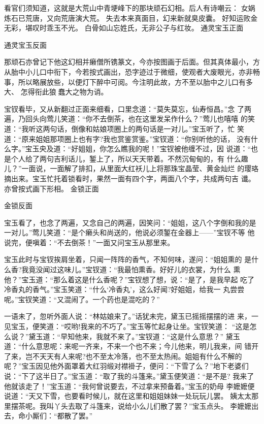 看官们须知道，这就是大荒山中青埂峰下的那块顽石幻相。后人有诗嘲云：
女娲炼石已荒唐，又向荒唐演大荒。
失去本来真面目，幻来新就臭皮囊。
好知运败金无彩，堪叹时乖玉不光。
白骨如山忘姓氏，无非公子与红妆。
通灵宝玉正面

通灵宝玉反面

那顽石亦曾记下他这幻相并癞僧所镌篆文，今亦按图画于后面。但其真体最小，方
从胎中小儿口中衔下，今若按式画出，恐字迹过于微细，使观者大废眼光，亦非畅
事，所以略展放些，以便灯下醉中可阅。今注明此故，方不至以胎中之儿口有多大、
怎得衔此狼蠢大之物为诮。

宝钗看毕，又从新翻过正面来细看，口里念道：“莫失莫忘，仙寿恒昌。”念
了两遍，乃回头向莺儿笑道：“你不去倒茶，也在这里发呆作什么？”莺儿也嘻嘻
的笑道：“我听这两句话，倒像和姑娘项圈上的两句话是一对儿。”宝玉听了，忙
笑道：“原来姐姐那项圈上也有字?我也赏鉴赏鉴。”宝钗道：“你别听他的话，
没有什么字。”宝玉央及道：“好姐姐，你怎么瞧我的呢！”宝钗被他缠不过，因
说道：“也是个人给了两句吉利话儿，錾上了，所以天天带着。不然沉甸甸的，有
什么趣儿？”一面说，一面解了排扣，从里面大红袄儿上将那珠宝晶莹、黄金灿烂
的璎珞摘出来。宝玉忙托着锁看时，果然一面有四个字，两面八个字，共成两句吉
谶。亦曾按式画下形相。
金锁正面

金锁反面

宝玉看了，也念了两遍，又念自己的两遍，因笑问：“姐姐，这八个字倒和我的是
一对儿。”莺儿笑道：“是个癞头和尚送的，他说必须錾在金器上——”宝钗不等
他说完，便嗔着：“不去倒茶！”一面又问宝玉从那里来。

宝玉此时与宝钗挨肩坐着，只闻一阵阵的香气，不知何味，遂问：“姐姐熏的
是什么香?我竟没闻过这味儿。”宝钗道：“我最怕熏香。好好儿的衣裳，为什么
熏他？”宝玉道：“那么着这是什么香呢？”宝钗想了想，说：“是了，是我早起
吃了冷香丸的香气。”宝玉笑道：“什么‘冷香丸’，这么好闻?好姐姐，给我一
丸尝尝呢。”宝钗笑道：“又混闹了。一个药也是混吃的？”

一语未了，忽听外面人说：“林姑娘来了。”话犹未完，黛玉已摇摇摆摆的进
来，一见宝玉，便笑道：“哎哟!我来的不巧了。”宝玉等忙起身让坐。宝钗笑道：
“这是怎么说？”黛玉道：“早知他来，我就不来了。”宝钗道：“这是什么意思？”
黛玉道：“什么意思呢：来呢一齐来，不来一个也不来；今儿他来，明儿我来，间
错开了来，岂不天天有人来呢?也不至太冷落，也不至太热闹。姐姐有什么不解的
呢？”宝玉因见他外面罩着大红羽缎对襟褂子，便问：“下雪了么？”地下老婆们
说：“下了这半日了。”宝玉道：“取了我的斗篷来。”黛玉便笑道：“是不是?
我来了他就该走了！”宝玉道：“我何曾说要去，不过拿来预备着。”宝玉的奶母
李嬷嬷便说道：“天又下雪，也要看时候儿，就在这里和姐姐妹妹一处玩玩儿罢。
姨太太那里摆茶呢。我叫丫头去取了斗篷来，说给小么儿们散了罢？”宝玉点头。
李嬷嬷出去，命小厮们：“都散了罢。”


